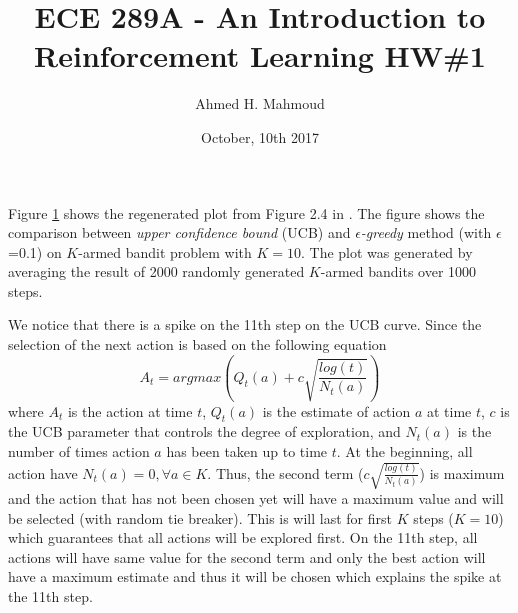 \documentclass[12pt] {article}
\begin{document}
\title{ECE 289A - An Introduction to Reinforcement Learning HW\#1}

\author{Ahmed H. Mahmoud}
\date{October, 10th 2017} 
\maketitle


Figure \ref{fig:fig} shows the regenerated plot from Figure 2.4 in \cite{sutton2011reinforcement}. The figure shows the comparison between \emph{upper confidence bound} (UCB) and \emph{$\epsilon$-greedy} method (with $\epsilon$ =0.1) on $K$-armed bandit problem with $K=10$. The plot was generated by averaging the result of 2000 randomly generated $K$-armed bandits over 1000 steps.  
\begin{figure}[!tbh]
\centering        
   \caption{ }
   \label{fig:fig}
\end{figure}
We notice that there is a spike on the 11th step on the UCB curve. Since the selection of the next action is based on the following equation 
$$
A_{t} = argmax(Q_{t} (a) + c \sqrt{ \frac{log(t)}{N_{t}(a)}})
$$ 
where $A_{t}$ is the action at time $t$, $Q_{t}(a)$ is the estimate of action $a$ at time $t$, $c$ is the UCB parameter that controls the degree of exploration, and $N_{t}(a)$ is the number of times action $a$ has been taken up to time $t$. At the beginning, all action have $N_{t}(a)=0, \forall a \in K$. Thus, the second term ($c \sqrt{ \frac{log(t)}{N_{t}(a)}}$) is maximum and the action that has not been chosen yet will have a maximum value and will be selected (with random tie breaker). This is will last for first $K$ steps ($K=10$) which guarantees that all actions will be explored first. On the 11th step, all actions will have same value for the second term and only the best action will have a maximum estimate and thus it will be chosen which explains the spike at the 11th step. 






\end{document}
